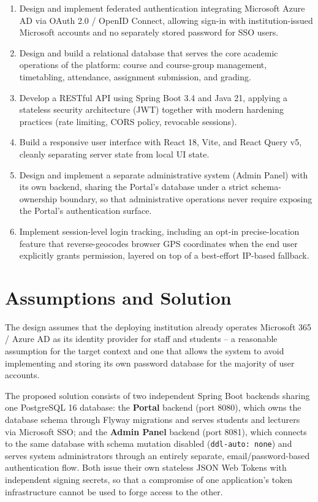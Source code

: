 \documentclass[12pt,a4paper]{report}
\begin{document}
\begin{enumerate}
\item Design and implement federated authentication integrating
Microsoft Azure AD via OAuth 2.0 / OpenID Connect, allowing sign-in with
institution-issued Microsoft accounts and no separately stored password
for SSO users.
\item Design and build a relational database that serves the core
academic operations of the platform: course and course-group
management, timetabling, attendance, assignment submission, and
grading.
\item Develop a RESTful API using Spring Boot 3.4 and Java 21, applying
a stateless security architecture (JWT) together with modern hardening
practices (rate limiting, CORS policy, revocable sessions).
\item Build a responsive user interface with React 18, Vite, and React
Query v5, cleanly separating server state from local UI state.
\item Design and implement a separate administrative system (Admin
Panel) with its own backend, sharing the Portal's database under a
strict schema-ownership boundary, so that administrative operations
never require exposing the Portal's authentication surface.
\item Implement session-level login tracking, including an opt-in
precise-location feature that reverse-geocodes browser GPS coordinates
when the end user explicitly grants permission, layered on top of a
best-effort IP-based fallback.
\end{enumerate}

\section{Assumptions and Solution}

The design assumes that the deploying institution already operates
Microsoft 365 / Azure AD as its identity provider for staff and
students -- a reasonable assumption for the target context and one that
allows the system to avoid implementing and storing its own password
database for the majority of user accounts.

The proposed solution consists of two independent Spring Boot
backends sharing one PostgreSQL 16 database: the \textbf{Portal}
backend (port 8080), which owns the database schema through Flyway
migrations and serves students and lecturers via Microsoft SSO; and the
\textbf{Admin Panel} backend (port 8081), which connects to the same
database with schema mutation disabled (\texttt{ddl-auto: none}) and
serves system administrators through an entirely separate,
email/password-based authentication flow. Both issue their own
stateless JSON Web Tokens with independent signing secrets, so that a
compromise of one application's token infrastructure cannot be used to
forge access to the other.
\end{document}
